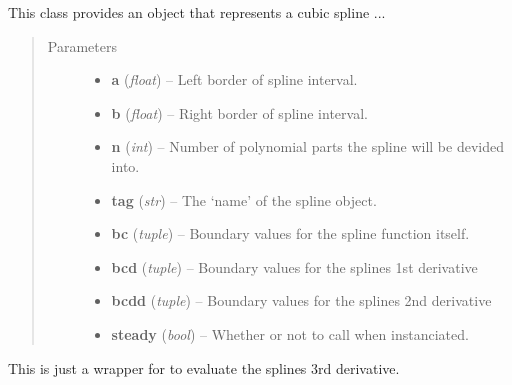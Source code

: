 \documentclass[letterpaper,10pt,english]{sphinxmanual}
\begin{document}
\begin{fulllineitems}
\label{pytrajectory:pytrajectory.spline.CubicSpline}
This class provides an object that represents a cubic spline ...
\begin{quote}\begin{description}
\item[{Parameters}] \leavevmode\begin{itemize}
\item {} 
\textbf{a} (\emph{float}) -- Left border of spline interval.

\item {} 
\textbf{b} (\emph{float}) -- Right border of spline interval.

\item {} 
\textbf{n} (\emph{int}) -- Number of polynomial parts the spline will be devided into.

\item {} 
\textbf{tag} (\emph{str}) -- The `name' of the spline object.

\item {} 
\textbf{bc} (\emph{tuple}) -- Boundary values for the spline function itself.

\item {} 
\textbf{bcd} (\emph{tuple}) -- Boundary values for the splines 1st derivative

\item {} 
\textbf{bcdd} (\emph{tuple}) -- Boundary values for the splines 2nd derivative

\item {} 
\textbf{steady} (\emph{bool}) -- Whether or not to call {\hyperref[pytrajectory:pytrajectory.spline.CubicSpline.makesteady]{}} when instanciated.

\end{itemize}

\end{description}\end{quote}

\begin{fulllineitems}
\label{pytrajectory:pytrajectory.spline.CubicSpline.dddf}
This is just a wrapper for {\hyperref[pytrajectory:pytrajectory.spline.CubicSpline.evalf]{}} to evaluate the splines 3rd derivative.


\end{fulllineitems}
\end{fulllineitems}
\end{document}

